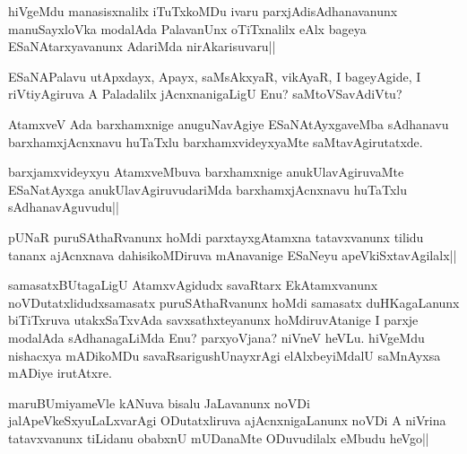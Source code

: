 \begin{artha}
hiVgeMdu manasisxnalilx iTuTxkoMDu ivaru parxjAdisAdhanavanunx manuSayxloVka modalAda PalavanUnx oTiTxnalilx eAlx bageya ESaNAtarxyavanunx AdariMda nirAkarisuvaru||
\end{artha}


\begin{artha}
ESaNAPalavu utApxdayx, Apayx, saMsAkxyaR, vikAyaR, I bageyAgide, I riVtiyAgiruva A Paladalilx jAcnxnanigaLigU Enu? saMtoVSavAdiVtu?
\end{artha}


\begin{artha}
AtamxveV Ada barxhamxnige anuguNavAgiye ESaNAtAyxgaveMba sAdhanavu barxhamxjAcnxnavu huTaTxlu barxhamxvideyxyaMte saMtavAgirutatxde.	
\end{artha}


\begin{artha}
barxjamxvideyxyu AtamxveMbuva barxhamxnige anukUlavAgiruvaMte ESaNatAyxga anukUlavAgiruvudariMda barxhamxjAcnxnavu huTaTxlu sAdhanavAguvudu||
\end{artha}

\begin{artha}
pUNaR puruSAthaRvanunx hoMdi parxtayxgAtamxna tatavxvanunx tilidu tananx ajAcnxnava dahisikoMDiruva mAnavanige ESaNeyu apeVkiSxtavAgilalx||
\end{artha}

\begin{artha}
samasatxBUtagaLigU AtamxvAgidudx savaRtarx EkAtamxvanunx noVDutatxlidudxsamasatx puruSAthaRvanunx hoMdi samasatx duHKagaLanunx biTiTxruva utakxSaTxvAda savxsathxteyanunx hoMdiruvAtanige I parxje modalAda sAdhanagaLiMda Enu? parxyoVjana? niVneV heVLu. hiVgeMdu nishacxya mADikoMDu savaRsarigushUnayxrAgi elAlxbeyiMdalU saMnAyxsa mADiye irutAtxre.
\end{artha}


\begin{artha}
maruBUmiyameVle kANuva bisalu JaLavanunx noVDi jalApeVkeSxyuLaLxvarAgi ODutatxliruva ajAcnxnigaLanunx noVDi A niVrina tatavxvanunx tiLidanu obabxnU mUDanaMte ODuvudilalx eMbudu heVgo||
\end{artha}

